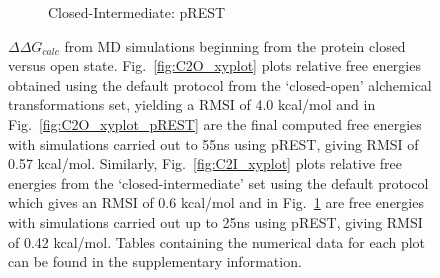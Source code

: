 \documentclass[T4paper.tex]{subfiles}
\begin{document}
\begin{figure}[!h]
\begin{subfigure}{.5\textwidth}
   \caption{Closed-Intermediate: pREST}
   \label{fig:C2I_xyplot_pREST}
\end{subfigure}\hfill
\caption{$\Delta\Delta G_{calc}$ from MD simulations beginning from the protein closed versus open state. Fig.~\ref{fig:C2O_xyplot} plots relative free energies obtained using the default protocol from the `closed-open' alchemical transformations set, yielding a RMSI of 4.0 kcal/mol and in Fig.~\ref{fig:C2O_xyplot_pREST} are the final computed free energies with simulations carried out to 55ns using pREST, giving RMSI of 0.57 kcal/mol. Similarly, Fig.~\ref{fig:C2I_xyplot} plots relative free energies from the `closed-intermediate' set using the default protocol which gives an RMSI of 0.6 kcal/mol and in Fig.~\ref{fig:C2I_xyplot_pREST} are  free energies with simulations carried out up to 25ns using pREST, giving RMSI of 0.42 kcal/mol. Tables containing the numerical data for each plot can be found in the supplementary information.}
\label{fig:conf-xyplots}
\end{figure}
\end{document}
